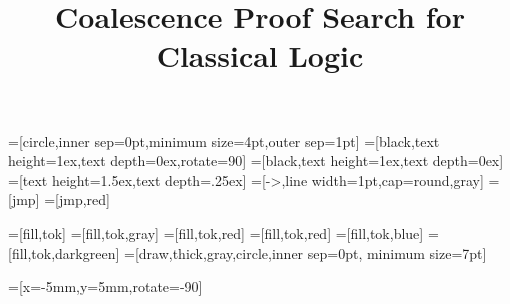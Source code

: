 \usepackage{amsmath}
\usepackage{amssymb}
\usepackage{amsthm}
\usepackage{bpextra}
\usepackage{float}
\usepackage{geometry}
\usepackage{latexsym}
\usepackage{natbib}
\usepackage{pdfpages}
\usepackage{subcaption}
\usepackage{tikz}
\usepackage{tkz-berge}
\usepackage{varwidth}

\usetikzlibrary{petri, topaths, positioning, decorations.pathmorphing}


\renewcommand{\bibsection}{}


\newcommand{\drawsquig}{\draw[-arr,
line join=round,
decorate, decoration={
    zigzag,
    segment length=4,
    amplitude=.9,post=lineto,
    post length=2pt
}]}

\newenvironment{scprooftree}[1]%
  {\gdef\scalefactor{#1}\begin{center}\proofSkipAmount \leavevmode}%
  {\scalebox{\scalefactor}{\DisplayProof}\proofSkipAmount \end{center} }


\newcommand\vc[1]{\vcenter{\hbox{#1}}}

\newcommand\atom[1]{%
 \ifx#11a\else%
 \ifx#12b\else%
 \ifx#13c\else%
 \fi\fi\fi
}

\newcommand\0{0}
\newcommand\1{1}
\newcommand\+{+}
\renewcommand\*{\times}

\newcommand{\tightplus}{\!+\!}
\newcommand{\tighttimes}{\!\*\!}
\newcommand\subs[1]{\mathsf{|#1|}}

=[circle,inner sep=0pt,minimum size=4pt,outer sep=1pt]
=[black,text height=1ex,text depth=0ex,rotate=90]
=[black,text height=1ex,text depth=0ex]%
=[text height=1.5ex,text depth=.25ex]
=[->,line width=1pt,cap=round,gray]
=[jmp]
=[jmp,red]

=[fill,tok]
=[fill,tok,gray]
=[fill,tok,red]
=[fill,tok,red]
=[fill,tok,blue]
=[fill,tok,darkgreen]
=[draw,thick,gray,circle,inner sep=0pt, minimum size=7pt]

=[x=-5mm,y=5mm,rotate=-90]

\def\deltaeq{\mathrel{\ensurestackMath{\stackon[1pt]{=}{\scriptstyle\Delta}}}}
\def\defeq{::=}
\def\seteq{:=}

\newcommand\dual{\overline}

\title{Coalescence Proof Search for Classical Logic}
\date{}

